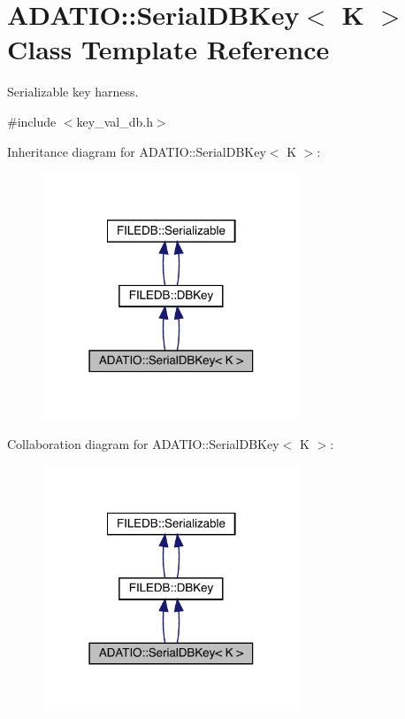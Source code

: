 \hypertarget{classADATIO_1_1SerialDBKey}{}\section{A\+D\+A\+T\+IO\+:\+:Serial\+D\+B\+Key$<$ K $>$ Class Template Reference}
\label{classADATIO_1_1SerialDBKey}


Serializable key harness.  




{\ttfamily \#include $<$key\+\_\+val\+\_\+db.\+h$>$}



Inheritance diagram for A\+D\+A\+T\+IO\+:\+:Serial\+D\+B\+Key$<$ K $>$\+:\nopagebreak
\begin{figure}[H]
\begin{center}
\leavevmode
\includegraphics[width=219pt]{d9/dbb/classADATIO_1_1SerialDBKey__inherit__graph}
\end{center}
\end{figure}


Collaboration diagram for A\+D\+A\+T\+IO\+:\+:Serial\+D\+B\+Key$<$ K $>$\+:\nopagebreak
\begin{figure}[H]
\begin{center}
\leavevmode
\includegraphics[width=219pt]{d3/df3/classADATIO_1_1SerialDBKey__coll__graph}
\end{center}
\end{figure}
